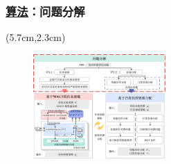 \begin{frame}
\frametitle{\englishfont \underline{算法}：问题分解}
\newBackground
\begin{center}
\begin{textblock*}{\textwidth}(5.7cm,2.3cm)
\begin{figure}
\includegraphics[width=0.45\textwidth]{fig/Fig3-3-solution-model1.pdf}
\end{figure}
\end{textblock*}
\end{center}


\end{frame}
